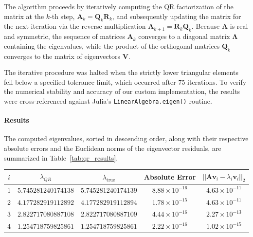 \begin{solution}

	The algorithm proceeds by iteratively computing the QR factorization of the
	matrix at the $k$-th step, $\mathbf{A}_k = \mathbf{Q}_k \mathbf{R}_k$, and
	subsequently updating the matrix for the next iteration via the reverse
	multiplication $\mathbf{A}_{k+1} = \mathbf{R}_k \mathbf{Q}_k$. Because
	$\mathbf{A}$ is real and symmetric, the sequence of matrices $\mathbf{A}_k$
	converges to a diagonal matrix $\mathbf{\Lambda}$ containing the eigenvalues,
	while the product of the orthogonal matrices $\mathbf{Q}_k$ converges to the
	matrix of eigenvectors $\mathbf{V}$.

	The iterative procedure was halted when the strictly lower triangular
	elements fell below a specified tolerance limit, which occurred after 75
	iterations. To verify the numerical stability and accuracy of our custom
	implementation, the results were cross-referenced against Julia's
	\texttt{LinearAlgebra.eigen()} routine.

	\paragraph{Results}
	The computed eigenvalues, sorted in descending order, along with their
	respective absolute errors and the Euclidean norms of the eigenvector residuals,
	are summarized in Table~\ref{tab:qr_results}.

	\begin{center}
		\centering
		\label{tab:qr_results}
		\renewcommand{\arraystretch}{1.2}
		\begin{tabular}{ccccc}
			\toprule
			$i$ & $\lambda_{QR}$      & $\lambda_{\text{true}}$ & Absolute Error         & $||\mathbf{A}\mathbf{v}_i - \lambda_i\mathbf{v}_i||_2$ \\ \midrule
			1   & $5.745281240174138$ & $5.745281240174139$     & $8.88 \times 10^{-16}$ & $4.63 \times 10^{-11}$                                 \\
			2   & $4.177282919112892$ & $4.177282919112894$     & $1.78 \times 10^{-15}$ & $4.63 \times 10^{-11}$                                 \\
			3   & $2.822717080887108$ & $2.822717080887109$     & $4.44 \times 10^{-16}$ & $2.27 \times 10^{-13}$                                 \\
			4   & $1.254718759825861$ & $1.254718759825861$     & $2.22 \times 10^{-16}$ & $1.02 \times 10^{-15}$                                 \\ \bottomrule
		\end{tabular}
	\end{center}


\end{solution}
